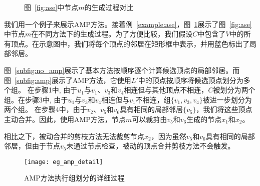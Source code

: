 \begin{figure} 
	\centering
	
	 \quad

	\caption{图~\ref{fig:ase}中节点$m$的生成过程对比}
	\label{fig:amp}

\end{figure}

\begin{example}
  我们用一个例子来展示AMP方法。接着例~\ref{example:ase}，图~\ref{fig:amp}展示了图~\ref{fig:ase}中节点$m$在不同方法下的生成过程。为了方便比较，我们假设$C$中包含了$V$中的所有顶点。在示意图中，我们将每个顶点的邻居在矩形框中表示，并用蓝色标出了局部邻居。

  图~\ref{subfig:no_amp}展示了基本方法按顺序逐个计算候选顶点的局部邻居。而图~\ref{subfig:amp}展示了AMP方法，它使用$L'$中的顶点按顺序将候选顶点划分为多个组。  在步骤\Num1中, 由于$u_1$与$v_1$、$v_3$和$v_4$相连但与其他顶点不相连，$C$被划分为两个组。在步骤\Num3中, 由于$u_1$与$v_3$和$v_4$相连但与$v_1$不相连，组$\{v_1, v_3, v_4\}$被进一步划分为两个组。
在步骤\Num4中，由于$v_2$、$v_5$和$v_6$具有相同的局部邻居$\{v_5\}$，我们将这些顶点主动合并。因此，使用AMP方法，节点$m$可以裁剪由$v_5$和$v_6$生成的节点$x_1$和$x_2$。

相比之下，被动合并的剪枝方法无法裁剪节点$x_2$，因为虽然$v_5$和$v_6$具有相同的局部邻居，但由于节点$v_5$未通过节点检查，被动的顶点合并剪枝方法不会触发。

\label{example:amp}
\end{example}

\begin{figure} 
	\centering
	
  \texttt{[image: eg\_amp\_detail]}

	\caption{AMP方法执行组划分的详细过程}
	\label{fig:amp_detail}

\end{figure}

